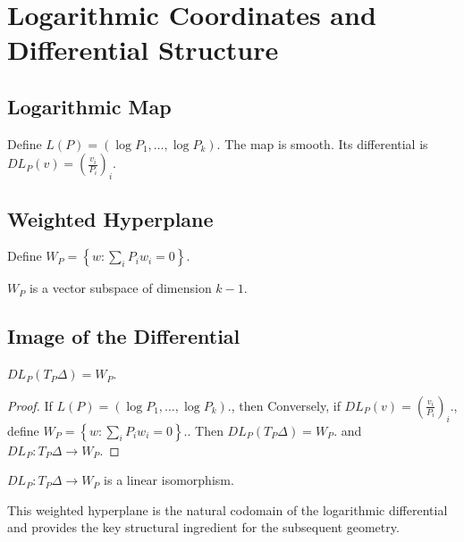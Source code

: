 \chapter[Logarithmic Coordinates]{Logarithmic Coordinates and Differential Structure}
\section{Logarithmic Map}
Define
$L(P)=(\log P_1,\ldots,\log P_k).$
The map is smooth.
Its differential is
$DL_P(v)=\left(\frac{v_i}{P_i}\right)_i.$
\section{Weighted Hyperplane}
Define
$W_P= \left\{ w:\sum_iP_iw_i=0 \right\}.$
\begin{proposition}
\label{ch:prop:3-1}
\(W_P\) is a vector subspace of dimension \(k-1\).
\end{proposition}
\section{Image of the Differential}
\begin{theorem}
\label{ch:thm:3-2}
$DL_P(T_P\Delta)=W_P.$
\end{theorem}
\begin{proof}
If $L(P)=(\log P_1,\ldots,\log P_k).$, then
Conversely, if $DL_P(v)=\left(\frac{v_i}{P_i}\right)_i.$, define $W_P= \left\{ w:\sum_iP_iw_i=0 \right\}.$. Then
$DL_P(T_P\Delta)=W_P.$ and $DL_P:T_P\Delta\to W_P$. 
\end{proof}

\begin{corollary}
\label{ch:cor:3-3}
$DL_P:T_P\Delta\to W_P$
is a linear isomorphism.
\end{corollary}
This weighted hyperplane is the natural codomain of the logarithmic
differential and provides the key structural ingredient for the
subsequent geometry.
